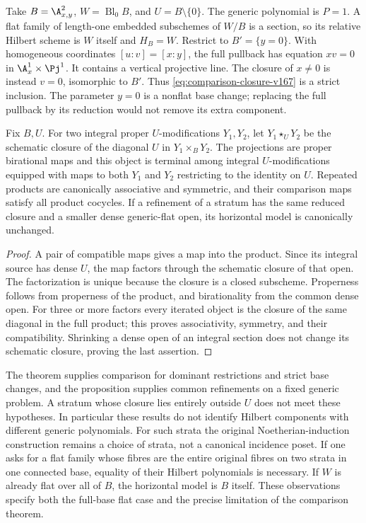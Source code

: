 \begin{example}
\label{ex:basechange-v167}
Take $B=\A^2_{x,y}$, $W=\operatorname{Bl}_0B$, and
$U=B\setminus\{0\}$. The generic polynomial is $P=1$.
A flat family of length-one embedded subschemes of $W/B$ is a
section, so its relative Hilbert scheme is $W$ itself and
$H_B=W$. Restrict to $B'=\{y=0\}$. With homogeneous coordinates
$[u:v]=[x:y]$, the full pullback has equation $xv=0$ in
$\A^1_x\times\Pj^1$. It contains a vertical projective line.
The closure of $x\ne0$ is instead $v=0$, isomorphic to $B'$.
Thus \eqref{eq:comparison-closure-v167} is a strict inclusion.
The parameter $y=0$ is a nonflat base change; replacing the full
pullback by its reduction would not remove its extra component.
\end{example}

\begin{proposition}
\label{prop:refinement-v167}
Fix $B,U$. For two integral proper $U$-modifications $Y_1,Y_2$,
let $Y_1\star_UY_2$ be the schematic closure of the diagonal
$U$ in $Y_1\times_BY_2$. The projections are proper birational
maps and this object is terminal among integral $U$-modifications
equipped with maps to both $Y_1$ and $Y_2$ restricting to the
identity on $U$. Repeated products are canonically associative
and symmetric, and their comparison maps satisfy all product
cocycles. If a refinement of a stratum has the same reduced
closure and a smaller dense generic-flat open, its horizontal
model is canonically unchanged.
\end{proposition}
\begin{proof}
A pair of compatible maps gives a map into the product. Since its
integral source has dense $U$, the map factors through the
schematic closure of that open. The factorization is unique
because the closure is a closed subscheme. Properness follows
from properness of the product, and birationality from the common
dense open. For three or more factors every iterated object is
the closure of the same diagonal in the full product; this proves
associativity, symmetry, and their compatibility. Shrinking a
dense open of an integral section does not change its schematic
closure, proving the last assertion.
\end{proof}

The theorem supplies comparison for dominant restrictions and
strict base changes, and the proposition supplies common
refinements on a fixed generic problem. A stratum whose closure
lies entirely outside $U$ does not meet these hypotheses. In
particular these results do not identify Hilbert components with
different generic polynomials. For such strata the original
Noetherian-induction construction remains a choice of strata,
not a canonical incidence poset. If one asks for a flat family
whose fibres are the entire original fibres on two strata in one
connected base, equality of their Hilbert polynomials is necessary.
If $W$ is already flat over all of $B$, the horizontal model is
$B$ itself. These observations specify both the full-base flat
case and the precise limitation of the comparison theorem.

